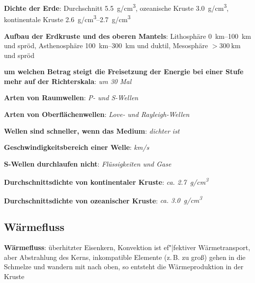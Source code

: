 \textbf{Dichte der Erde}:
Durchschnitt \SI{5.5}{\gram/\centi\meter\cubed},
ozeanische Kruste \SI{3.0}{\gram/\centi\meter\cubed},
kontinentale Kruste \SIrange{2.6}{2.7}{\gram/\centi\meter\cubed}

\textbf{Aufbau der Erdkruste und des oberen Mantels}:
Lithosphäre \SIrange{0}{100}{\kilo\meter} und spröd,
Asthenosphäre \SIrange{100}{300}{\kilo\meter} und duktil,
Mesosphäre $> \SI{300}{\kilo\meter}$ und spröd

\begin{wichtig}
    \item
    \textbf{um welchen Betrag steigt die Freisetzung der Energie bei einer Stufe mehr
    auf der Richterskala}:
    \emph{um 30 Mal}

    \item
    \textbf{Arten von Raumwellen}:
    \emph{P- und S-Wellen}

    \item
    \textbf{Arten von Oberflächenwellen}:
    \emph{Love- und Rayleigh-Wellen}

    \item
    \textbf{Wellen sind schneller, wenn das Medium}:
    \emph{dichter ist}

    \item
    \textbf{Geschwindigkeitsbereich einer Welle}:
    \emph{\si[math-rm=\mathit,text-rm=\itshape]{\kilo\meter/\second}}

    \item
    \textbf{S-Wellen durchlaufen nicht}:
    \emph{Flüssigkeiten und Gase}

    \item
    \textbf{Durchschnittsdichte von kontinentaler Kruste}:
    \emph{ca. \SI[math-rm=\mathit,text-rm=\itshape]{2.7}{\gram/\centi\meter^3}}

    \item
    \textbf{Durchschnittsdichte von ozeanischer Kruste}:
    \emph{ca. \SI[math-rm=\mathit,text-rm=\itshape]{3.0}{\gram/\centi\meter^3}}
\end{wichtig}

\pagebreak

\subsection{%
    Wärmefluss%
}

\textbf{Wärmefluss}:
überhitzter Eisenkern,
Konvektion ist ef"|fektiver Wärmetransport,
aber Abstrahlung des Kerns,
inkompatible Elemente (z.\,B. zu groß) gehen in die Schmelze und wandern mit nach oben,
so entsteht die Wärmeproduktion in der Kruste

